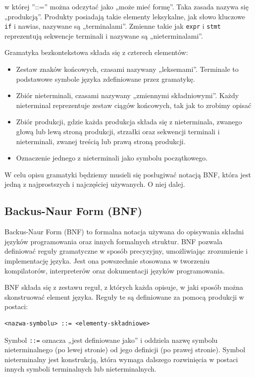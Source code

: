 w której ''::='' można odczytać jako „może mieć formę”. Taka zasada nazywa się „produkcją”. Produkty posiadają takie elementy leksykalne, jak słowo kluczowe \texttt{if} i nawias, nazywane są „terminalami”. Zmienne takie jak \texttt{expr} i \texttt{stmt} reprezentują sekwencje terminali i nazywane są „nieterminalami”.

Gramatyka bezkontekstowa składa się z czterech elementów:
\begin{itemize}
    \item Zestaw znaków końcowych, czasami nazywany „leksemami”. Terminale to podstawowe symbole języka zdefiniowane przez gramatykę.
    \item Zbiór nieterminali, czasami nazywany „zmiennymi składniowymi”. Każdy nieterminal reprezentuje zestaw ciągów końcowych, tak jak to zrobimy opisać
    \item Zbiór produkcji, gdzie każda produkcja składa się z nieterminala, zwanego głową lub lewą stroną produkcji, strzałki oraz sekwencji terminali i nieterminali, zwanej treścią lub prawą stroną produkcji.
    \item Oznaczenie jednego z nieterminali jako symbolu początkowego.
\end{itemize}

W celu opisu gramatyki będziemy musieli się posługiwać notacją BNF, która jest jedną z najprostszych i najczęściej używanych. O niej dalej.

\subsection{Backus-Naur Form (BNF)}

Backus-Naur Form (BNF) to formalna notacja używana do opisywania składni języków programowania oraz innych formalnych struktur. BNF pozwala definiować reguły gramatyczne w sposób precyzyjny, umożliwiając zrozumienie i implementację języka. Jest ona powszechnie stosowana w tworzeniu kompilatorów, interpreterów oraz dokumentacji języków programowania.

BNF składa się z zestawu reguł, z których każda opisuje, w jaki sposób można skonstruować element języka. Reguły te są definiowane za pomocą produkcji w postaci:

\begin{verbatim}
<nazwa-symbolu> ::= <elementy-składniowe>
\end{verbatim}

Symbol \texttt{::=} oznacza „jest definiowane jako” i oddziela nazwę symbolu nieterminalnego (po lewej stronie) od jego definicji (po prawej stronie). Symbol nieterminalny jest konstrukcją, która wymaga dalszego rozwinięcia w postaci innych symboli terminalnych lub nieterminalnych.

